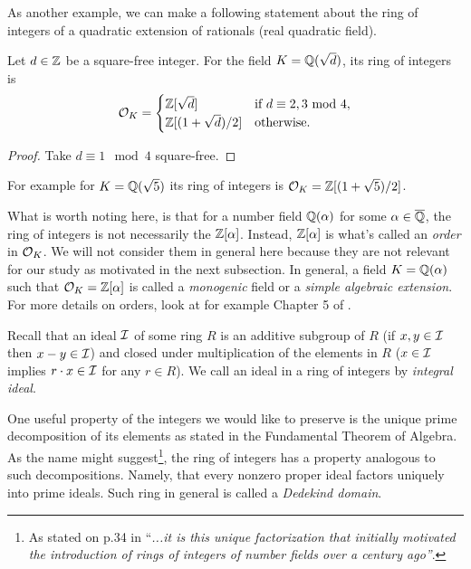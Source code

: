 As another example, we can make a following statement about the ring of integers of a quadratic extension of rationals (real quadratic field).
\begin{lemma}
     Let $d \in \mathbb{Z}$ be a square-free integer. For the field $K = \mathbb{Q}(\sqrt{d})$, its ring of integers is 
     \[ \mathcal{O}_K = 
	 \begin{cases} 
	     \mathbb{Z}[\sqrt{d}] & \text{if $d \equiv 2, 3 \text{ mod } 4$}, \\
	     \mathbb{Z}[(1 + \sqrt{d})/2] & \text{otherwise}.
     	 \end{cases}
     \]
\end{lemma}

\begin{proof}
	Take $d \equiv 1 \mod 4$ square-free. 
\end{proof}
For example for $K = \mathbb{Q}(\sqrt{5})$ its ring of integers is $\mathcal{O}_K = \mathbb{Z}[(1 + \sqrt{5})/2]$. 
\begin{remark}\label{monogenic}
	What is worth noting here, is that for a number field $\mathbb{Q}(\alpha)$ for some $\alpha \in \overline{\mathbb{Q}}$, the ring of integers is not necessarily the $\mathbb{Z}[\alpha]$. Instead, $\mathbb{Z}[\alpha]$ is what's called an \textit{order} in $\mathcal{O}_K$. We will not consider them in general here because they are not relevant for our study as motivated in the next subsection. In general, a field $K = \mathbb{Q}(\alpha)$ such that $\mathcal{O}_K = \mathbb{Z}[\alpha]$ is called a \textit{monogenic} field or a \textit{simple algebraic extension}. For more details on orders, look at for example Chapter 5 of \cite{stein}.
\end{remark}

Recall that an ideal $\mathcal{I}$ of some ring $R$ is an additive subgroup of $R$ (if $x,y \in \mathcal{I}$ then $x-y \in \mathcal{I}$) and closed under multiplication of the elements in $R$ ($x \in \mathcal{I}$ implies $r \cdot x \in \mathcal{I}$ for any $r \in R$). We call an ideal in a ring of integers by \textit{integral ideal}.

One useful property of the integers we would like to preserve is the unique prime decomposition of its elements as stated in the Fundamental Theorem of Algebra. As the name might suggest\footnote{As stated on p.34 in \cite{stein} ``\textit{...it is this unique factorization that initially motivated the introduction of rings of integers of number fields over a century ago''}.}, the ring of integers has a property analogous to such decompositions. Namely, that every nonzero proper ideal factors uniquely into prime ideals. Such ring in general is called a \textit{Dedekind domain}.

